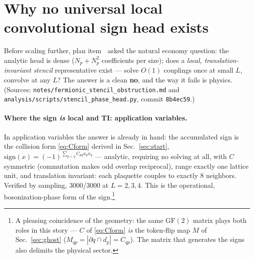 \documentclass[11pt]{article}
\newcommand{\GF}{\mathrm{GF}(2)}
\newcommand{\file}[1]{\texttt{#1}}
\newcommand{\circled}[1]{\textcircled{\raisebox{-0.5pt}{\scriptsize #1}}}
\begin{document}
\section{Why no universal local convolutional sign head exists}
\label{sec:stencil}

Before scaling further, plan item \circled{2} asked the natural economy question: the
analytic head is dense ($N_p+N_p^2$ coefficients per size); does a \emph{local,
translation-invariant stencil} representative exist --- solve $O(1)$ couplings
once at small $L$, convolve at any $L$? The answer is a clean \textbf{no},
and the way it fails is physics. (Sources:
\file{notes/fermionic\_stencil\_obstruction.md} and
\file{analysis/scripts/stencil\_phase\_head.py}, commit \texttt{8b4ec59}.)

\paragraph{Where the sign \emph{is} local and TI: application variables.}
In application variables the answer is already in hand: the accumulated sign
is the collision form \eqref{eq:Cform} derived in Sec.~\ref{sec:start},
$\mathrm{sign}(x)=(-1)^{\sum_{p<q}C_{pq}x_px_q}$ --- analytic, requiring no
solving at all, with $C$ symmetric (commutation makes odd overlap
reciprocal), range exactly one lattice unit, and translation invariant: each
plaquette couples to exactly 8 neighbors. Verified by sampling, 3000/3000 at
$L=2,3,4$. This is the operational, bosonization-phase form of the
sign.\footnote{A pleasing coincidence of the geometry: the same $\GF$
matrix plays both roles in this story --- $C$ of \eqref{eq:Cform} \emph{is} the
token-flip map $M$ of Sec.~\ref{sec:ghost} ($M_{qp}=|\partial q\cap
d_p|=C_{qp}$). The matrix that generates the signs also delimits the physical
sector.}
\end{document}
